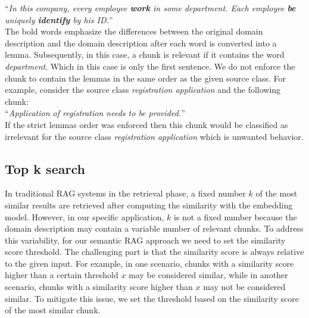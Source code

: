 ``\textit{In this company, every employee \textbf{work} in some department. Each employee \textbf{be} uniquely \textbf{identify} by his ID.}'' \\

The bold words emphasize the differences between the original domain description and the domain description after each word is converted into a lemma. Subsequently, in this case, a chunk is relevant if it contains the word \textit{department}. Which in this case is only the first sentence. We do not enforce the chunk to contain the lemmas in the same order as the given source class. For example, consider the source class \textit{registration application} and the following chunk: \\

\noindent{}``\textit{Application of registration needs to be provided.}'' \\

\noindent{}If the strict lemmas order was enforced then this chunk would be classified as irrelevant for the source class \textit{registration application} which is unwanted behavior.


\subsection{Top k search}
\label{sec:top_k_search}

In traditional RAG systems in the retrieval phase, a fixed number $k$ of the most similar results are retrieved after computing the similarity with the embedding model. However, in our specific application, $k$ is not a fixed number because the domain description may contain a variable number of relevant chunks. To address this variability, for our semantic RAG approach we need to set the similarity score threshold. The challenging part is that the similarity score is always relative to the given input. For example, in one scenario, chunks with a similarity score higher than a certain threshold $x$ may be considered similar, while in another scenario, chunks with a similarity score higher than $x$ may not be considered similar. To mitigate this issue, we set the threshold based on the similarity score of the most similar chunk.

